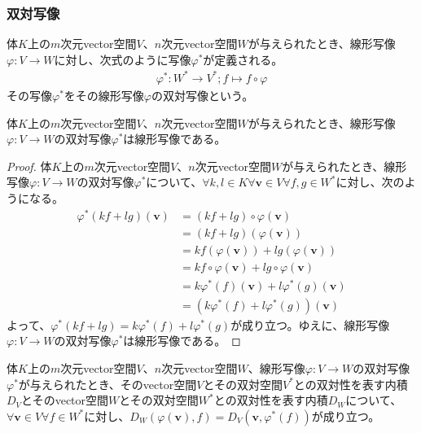 \documentclass[dvipdfmx]{jsarticle}
\begin{document}
\subsubsection{双対写像}%
\begin{dfn}
体$K$上の$m$次元vector空間$V$、$n$次元vector空間$W$が与えられたとき、線形写像$\varphi:V \rightarrow W$に対し、次式のように写像$\varphi^{*}$が定義される。
\begin{align*}
\varphi^{*}:W^{*} \rightarrow V^{*};f \mapsto f \circ \varphi
\end{align*}
その写像$\varphi^{*}$をその線形写像$\varphi$の双対写像という。
\end{dfn}
\begin{thm}\label{2.4.4.12}
体$K$上の$m$次元vector空間$V$、$n$次元vector空間$W$が与えられたとき、線形写像$\varphi:V \rightarrow W$の双対写像$\varphi^{*}$は線形写像である。
\end{thm}
\begin{proof}
体$K$上の$m$次元vector空間$V$、$n$次元vector空間$W$が与えられたとき、線形写像$\varphi:V \rightarrow W$の双対写像$\varphi^{*}$について、$\forall k,l \in K\forall\mathbf{v} \in V\forall f,g \in W^{*}$に対し、次のようになる。
\begin{align*}
\varphi^{*}(kf + lg)\left( \mathbf{v} \right) &= (kf + lg) \circ \varphi\left( \mathbf{v} \right)\\
&= (kf + lg)\left( \varphi\left( \mathbf{v} \right) \right)\\
&= kf\left( \varphi\left( \mathbf{v} \right) \right) + lg\left( \varphi\left( \mathbf{v} \right) \right)\\
&= kf \circ \varphi\left( \mathbf{v} \right) + lg \circ \varphi\left( \mathbf{v} \right)\\
&= k\varphi^{*}(f)\left( \mathbf{v} \right) + l\varphi^{*}(g)\left( \mathbf{v} \right)\\
&= \left( k\varphi^{*}(f) + l\varphi^{*}(g) \right)\left( \mathbf{v} \right)
\end{align*}
よって、$\varphi^{*}(kf + lg) = k\varphi^{*}(f) + l\varphi^{*}(g)$が成り立つ。ゆえに、線形写像$\varphi:V \rightarrow W$の双対写像$\varphi^{*}$は線形写像である。
\end{proof}
\begin{thm}\label{2.4.4.13}
体$K$上の$m$次元vector空間$V$、$n$次元vector空間$W$、線形写像$\varphi:V \rightarrow W$の双対写像$\varphi^{*}$が与えられたとき、そのvector空間$V$とその双対空間$V^{*}$との双対性を表す内積$D_{V}$とそのvector空間$W$とその双対空間$W^{*}$との双対性を表す内積$D_{W}$について、$\forall\mathbf{v} \in V\forall f \in W^{*}$に対し、$D_{W}\left( \varphi\left( \mathbf{v} \right),f \right) = D_{V}\left( \mathbf{v},\varphi^{*}(f) \right)$が成り立つ。
\end{thm}
\end{document}
